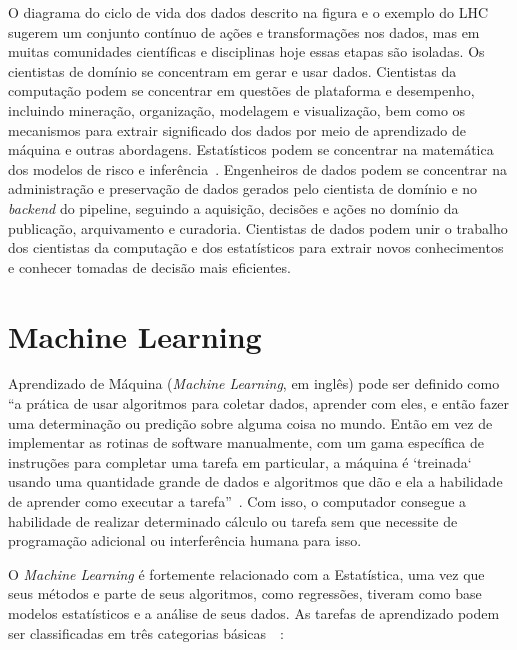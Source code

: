\documentclass[portugues]{ic-tese}
\begin{document}
O diagrama do ciclo de vida dos dados descrito na figura e o exemplo do LHC sugerem um conjunto contínuo de ações e transformações nos dados, mas em muitas comunidades científicas e disciplinas hoje essas etapas são isoladas. Os cientistas de domínio se concentram em gerar e usar dados. Cientistas da computação podem se concentrar em questões de plataforma e desempenho, incluindo mineração, organização, modelagem e visualização, bem como os mecanismos para extrair significado dos dados por meio de aprendizado de máquina e outras abordagens. Estatísticos podem se concentrar na matemática dos modelos de risco e inferência~\citep{Berman_2018}. Engenheiros de dados podem se concentrar na administração e preservação de dados gerados pelo cientista de domínio e no \textit{backend} do pipeline, seguindo a aquisição, decisões e ações no domínio da publicação, arquivamento e curadoria. Cientistas de dados podem unir o trabalho dos cientistas da computação e dos estatísticos para extrair novos conhecimentos e conhecer tomadas de decisão mais eficientes.


\section{Machine Learning}

Aprendizado de Máquina (\textit{Machine Learning}, em inglês) pode ser definido como “a prática de usar algoritmos para coletar dados, aprender com eles, e então fazer uma determinação ou predição sobre alguma coisa no mundo. Então em vez de implementar as rotinas de software manualmente, com um gama específica de instruções para completar uma tarefa em particular, a máquina é `treinada` usando uma quantidade grande de dados e algoritmos que dão e ela a habilidade de aprender como executar a tarefa”~\citep{Copeland_2016}. Com isso, o computador consegue a habilidade de realizar determinado cálculo ou tarefa sem que necessite de programação adicional ou interferência humana para isso.

O \textit{Machine Learning} é fortemente relacionado com a Estatística, uma vez que seus métodos e parte de seus algoritmos, como regressões, tiveram como base modelos estatísticos e a análise de seus dados. As tarefas de aprendizado podem ser classificadas em três categorias básicas~\citep{MLWikipedia_2021}~\citep{MLSAS_2021}:
\end{document}
